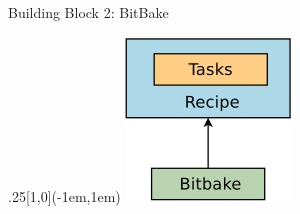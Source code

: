 \documentclass[ucs,9pt]{beamer}
\begin{document}
\begin{frame}[fragile]
    {Building Block 2: BitBake}

    \begin{textblock*}{.25\paperwidth}[1,0](\paperwidth-1em,1em)%
        \includegraphics[width=\linewidth]{images/bitbake-definition}
    \end{textblock*}


\end{frame}
\end{document}
